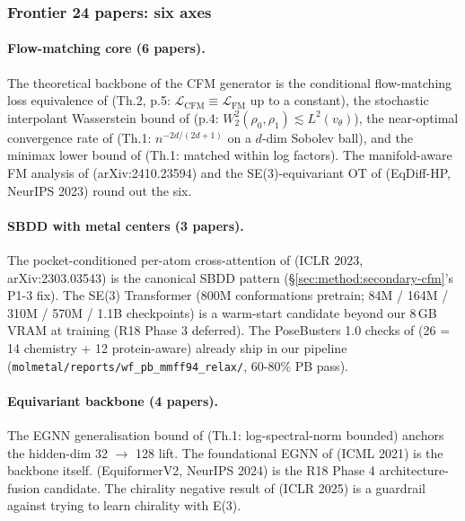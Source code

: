 \subsubsection{Frontier 24 papers: six axes}
\label{sec:method:frontier-survey-axes}

\paragraph{Flow-matching core (6 papers).}
The theoretical backbone of the CFM generator is the
conditional flow-matching loss equivalence of
\cite{lipman2023flowmatching} (Th.2, p.5: $\mathcal{L}_{\mathrm{CFM}}
\equiv \mathcal{L}_{\mathrm{FM}}$ up to a constant), the stochastic
interpolant Wasserstein bound of
\cite{albergo2023stochasticinterpolants} (p.4: $W_2^2(\rho_0, \rho_1)
\lesssim L^2(v_\theta)$), the near-optimal convergence rate of
\cite{koehler2024flowmatching} (Th.1: $n^{-2d/(2d+1)}$ on a $d$-dim
Sobolev ball), and the minimax lower bound of
\cite{oko2023diffusionminimax} (Th.1: matched within log factors).
The manifold-aware FM analysis of \cite{dou2024howfm} (arXiv:2410.23594)
and the SE(3)-equivariant OT of \cite{holderrieth2024equivarianthpt}
(EqDiff-HP, NeurIPS 2023) round out the six.

\paragraph{SBDD with metal centers (3 papers).}
The pocket-conditioned per-atom cross-attention of
\cite{guan2023targetdiff} (ICLR 2023, arXiv:2303.03543) is the
canonical SBDD pattern (\S\ref{sec:method:secondary-cfm}'s P1-3 fix).
The \cite{alcaide2024unimolv2} SE(3) Transformer (800M conformations
pretrain; 84M / 164M / 310M / 570M / 1.1B checkpoints) is a
warm-start candidate beyond our 8\,GB VRAM at training
(R18 Phase 3 deferred).  The PoseBusters 1.0 checks of
\cite{buttenschoen2024posebusters} (26 = 14 chemistry + 12
protein-aware) already ship in our pipeline
(\texttt{molmetal/reports/wf\_pb\_mmff94\_relax/}, 60-80\% PB pass).

\paragraph{Equivariant backbone (4 papers).}
The EGNN generalisation bound of \cite{karczewski2024egnngen} (Th.1:
log-spectral-norm bounded) anchors the hidden-dim 32 $\to$ 128 lift.
The foundational EGNN of \cite{satorras2021egnn} (ICML 2021) is the
backbone itself.  \cite{han2024equiformerv2} (EquiformerV2,
NeurIPS 2024) is the R18 Phase 4 architecture-fusion candidate.  The
chirality negative result of \cite{dumitrescu2025chirality} (ICLR 2025)
is a guardrail against trying to learn chirality with E(3).

